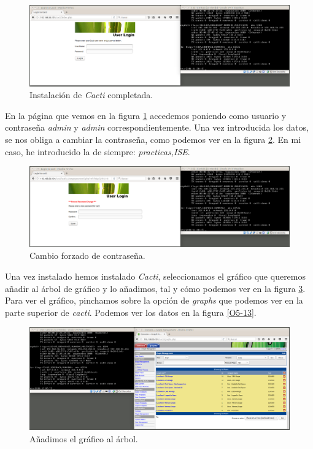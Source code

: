 \documentclass[a4paper,titlepage,12pt]{scrartcl}	%
\numberwithin{figure}{section} %
\numberwithin{table}{section} %
\begin{document}
	\begin{figure}[H]
		\includegraphics[width=\linewidth]{./Imagenes/O5-10.png}
		\vspace{-0.5cm}
		\caption[Instalación de \textit{Cacti} completada.]{Instalación de \textit{Cacti} completada.}
		\label{O5-10}
	\end{figure}
	
	En la página que vemos en la figura \ref{O5-10} accedemos poniendo como usuario y contraseña \textit{admin} y \textit{admin} correspondientemente. Una vez introducida los datos, se nos obliga a cambiar la contraseña, como podemos ver en la figura \ref{O5-11}. En mi caso, he introducido la de siempre: \textit{practicas,ISE}.
	
	\begin{figure}[H]
		\includegraphics[width=\linewidth]{./Imagenes/O5-11.png}
		\vspace{-0.5cm}
		\caption[Cambio forzado de contraseña.]{Cambio forzado de contraseña.}
		\label{O5-11}
	\end{figure}
	
	Una vez instalado hemos instalado \textit{Cacti}, seleccionamos el gráfico que queremos añadir al árbol de gráfico y lo añadimos, tal y cómo podemos ver en la figura \ref{O5-12}. Para ver el gráfico, pinchamos sobre la opción de \textit{graphs} que podemos ver en la parte superior de \textit{cacti}. Podemos ver los datos en la figura \ref{O5-13}.
	
	\begin{figure}[H]
		\includegraphics[width=\linewidth]{./Imagenes/O5-12.png}
		\vspace{-0.5cm}
		\caption[Añadimos el gráfico al árbol.]{Añadimos el gráfico al árbol.}
		\label{O5-12}
	\end{figure}
	
\end{document}
